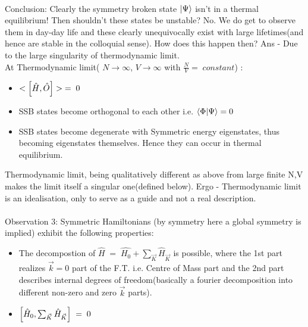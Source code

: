 \documentclass[12pt]{article}
\begin{document}
\\
Conclusion: Clearly the symmetry broken state $\ket{\Psi}$ isn't in a thermal equilibrium! Then shouldn't these states be unstable? 
No. We do get to observe them in day-day life and these clearly unequivocally exist with large lifetimes(and hence are stable in the colloquial sense).
How does this happen then? Ans - Due to the large singularity of thermodynamic limit. \\
At Thermodynamic limit( $N\rightarrow \infty$, $V\rightarrow \infty$ with $\displaystyle{\frac{N}{V}=\; constant}$) :
\begin{itemize}
    \item  $<\comm{\hat{H}}{\hat{O}}>\;=\;0$
    \item SSB states become orthogonal to each other i.e. $\braket{\Phi}{\Psi}=0$
    \item SSB states become degenerate with Symmetric energy eigenstates, thus becoming eigenstates themselves. Hence they can occur in thermal equilibrium.
\end{itemize}
Thermodynamic limit, being qualitatively different as above from large finite N,V makes the limit itself a singular one(defined below). Ergo - Thermodynamic limit is an idealisation, only to serve as a guide and not a real description.\\
\\
Observation 3: Symmetric Hamiltonians (by symmetry here a global symmetry is implied) exhibit the following properties:

\begin{itemize}
    \item The decompostion of $\hat{H}\;=\;\hat{H_0} + \sum_{\Vec{K}}\hat{H}_{\Vec{K}}$ is possible, where the 1st part realizes $\Vec{k}=0$ part of the F.T. i.e. Centre of Mass part and the 2nd part describes internal degrees of freedom(basically a fourier decomposition into different non-zero and zero $\Vec{k}$ parts).
    \item $\comm{\hat{H}_0}{\sum_{\Vec{K}}\hat{H}_{\Vec{K}}}\;=\;0$
\end{itemize}
\end{document}
